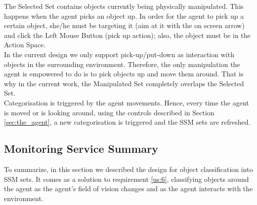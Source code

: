 The Selected Set contains objects currently being physically manipulated. This happens when the agent picks an object up. In order for the agent to pick up a certain object, she/he must be targeting it (aim at it with the on screen arrow) and click the Left Mouse Button (pick up action); also, the object must be in the Action Space.\\

In the current design we only support pick-up/put-down as interaction with objects in the surrounding environment. Therefore, the only manipulation the agent is empowered to do is to pick objects up and move them around. That is why in the current work, the Manipulated Set completely overlaps the Selected Set.\\

Categorisation is triggered by the agent movements. Hence, every time the agent is moved or is looking around, using the controls described in Section \ref{sec:the_agent}, a new categorisation is triggered and the SSM sets are refreshed.\\

\subsection{Monitoring Service Summary}\label{subsec:monitoring_service_summary}
To summarize, in this section we described the design for object classification into SSM sets. It comes as a solution to requirement \ref{us:6}, classifying objects around the agent as the agent's field of vision changes and as the agent interacts with the environment.

